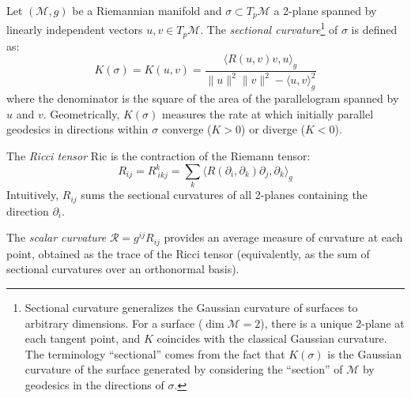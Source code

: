 \begin{definition}\label{def:curvatura_seccional}
Let $(\mathcal{M}, g)$ be a Riemannian manifold and $\sigma \subset T_p\mathcal{M}$ a 2-plane spanned by linearly independent vectors $u, v \in T_p\mathcal{M}$. The \textit{sectional curvature}\footnote{Sectional curvature generalizes the Gaussian curvature of surfaces to arbitrary dimensions. For a surface ($\dim \mathcal{M} = 2$), there is a unique 2-plane at each tangent point, and $K$ coincides with the classical Gaussian curvature. The terminology ``sectional'' comes from the fact that $K(\sigma)$ is the Gaussian curvature of the surface generated by considering the ``section'' of $\mathcal{M}$ by geodesics in the directions of $\sigma$.} of $\sigma$ is defined as:
\begin{equation}\label{eq:curvatura_seccional}
K(\sigma) = K(u,v) = \frac{\langle R(u,v)v, u \rangle_g}{\|u\|^2\|v\|^2 - \langle u,v \rangle_g^2}
\end{equation}
where the denominator is the square of the area of the parallelogram spanned by $u$ and $v$. Geometrically, $K(\sigma)$ measures the rate at which initially parallel geodesics in directions within $\sigma$ converge ($K > 0$) or diverge ($K < 0$).
\end{definition}

\begin{definition}\label{def:ricci_escalar}
The \textit{Ricci tensor} $\mathrm{Ric}$ is the contraction of the Riemann tensor:
\[
R_{ij} = R^k_{\ ikj} = \sum_{k} \langle R(\partial_i, \partial_k)\partial_j, \partial_k \rangle_g
\]
Intuitively, $R_{ij}$ sums the sectional curvatures of all 2-planes containing the direction $\partial_i$.

The \textit{scalar curvature} $\mathcal{R} = g^{ij}R_{ij}$ provides an average measure of curvature at each point, obtained as the trace of the Ricci tensor (equivalently, as the sum of sectional curvatures over an orthonormal basis).
\end{definition}

